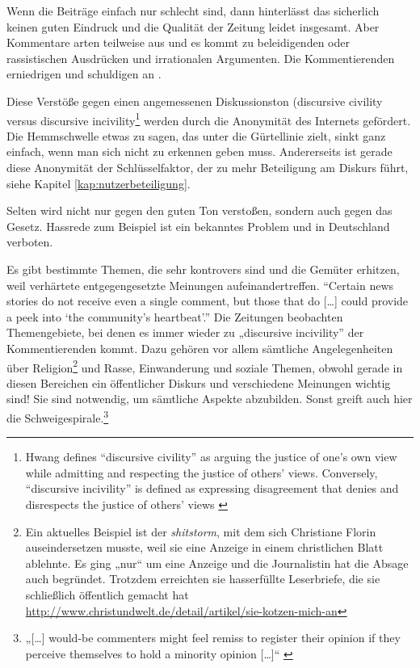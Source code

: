 Wenn die Beiträge einfach nur schlecht sind, dann hinterlässt das sicherlich
keinen guten Eindruck und die Qualität der Zeitung leidet insgesamt. Aber
Kommentare arten teilweise aus und es kommt zu beleidigenden oder rassistischen
Ausdrücken und irrationalen Argumenten. Die Kommentierenden erniedrigen und
schuldigen an \autocite[S.~103]{reich}.

Diese Verstöße gegen einen angemessenen Diskussionston (\glqq discursive
civility\grqq{} versus \glqq discursive incivility\grqq\footnote{Hwang defines
  ``discursive civility'' as arguing the justice of one's own view while
  admitting and respecting the justice of others' views. Conversely,
  ``discursive incivility'' is defined as expressing disagreement that denies
and disrespects the justice of others' views \autocite{hwang}
\autocite[S.~6/7]{santana:2014}} werden durch die Anonymität des Internets
gefördert. Die Hemmschwelle etwas zu sagen, das unter die Gürtellinie zielt,
sinkt ganz einfach, wenn man sich nicht zu erkennen geben muss. Andererseits ist
gerade diese Anonymität der Schlüsselfaktor, der zu mehr Beteiligung am Diskurs
führt, siehe Kapitel \ref{kap:nutzerbeteiligung}.

Selten wird nicht nur gegen den guten Ton verstoßen, sondern auch gegen das
Gesetz. Hassrede zum Beispiel ist ein bekanntes Problem und in Deutschland
verboten.

Es gibt bestimmte Themen, die sehr kontrovers sind und die Gemüter erhitzen,
weil verhärtete entgegengesetzte Meinungen aufeinandertreffen. ``Certain news
stories do not receive even a single comment, but those that do [\ldots] could
provide a peek into `the community’s heartbeat'.'' \autocite[S.~181]{loke} Die
Zeitungen beobachten Themengebiete, bei denen es immer wieder zu „discursive
incivility” der Kommentierenden kommt. Dazu gehören vor allem sämtliche
Angelegenheiten über Religion\footnote{Ein aktuelles Beispiel ist der {\slshape
shitstorm}, mit dem sich Christiane Florin auseindersetzen musste, weil sie eine
Anzeige in einem christlichen Blatt ablehnte. Es ging „nur“ um eine Anzeige und
die Journalistin hat die Absage auch begründet. Trotzdem erreichten sie
hasserfüllte Leserbriefe, die sie schließlich öffentlich gemacht hat
\url{http://www.christundwelt.de/detail/artikel/sie-kotzen-mich-an}} und Rasse,
Einwanderung und soziale Themen, obwohl gerade in diesen Bereichen ein
öffentlicher Diskurs und verschiedene Meinungen wichtig sind! Sie sind
notwendig, um sämtliche Aspekte abzubilden. Sonst greift auch hier die
Schweigespirale.\footnote{„[\ldots] would-be commenters might feel remiss to
register their opinion if they perceive themselves to hold a minority opinion
[\ldots]“ \autocite[S.~12]{santana:2014}}

